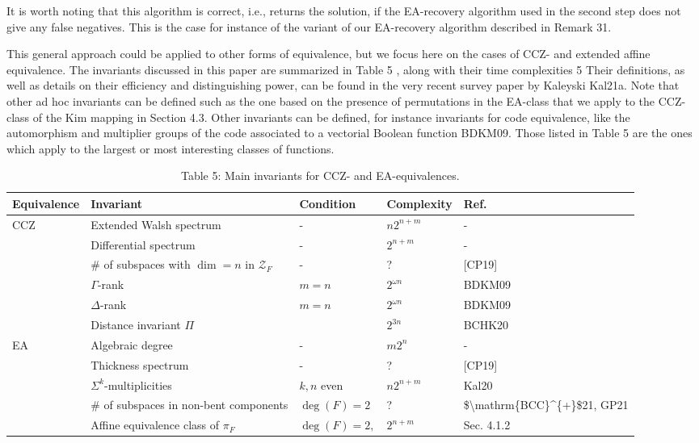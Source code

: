 \documentclass[10pt]{article}
\begin{document}
It is worth noting that this algorithm is correct, i.e., returns the solution, if the EA-recovery algorithm used in the second step does not give any false negatives. This is the case for instance of the variant of our EA-recovery algorithm described in Remark 31.

This general approach could be applied to other forms of equivalence, but we focus here on the cases of CCZ- and extended affine equivalence. The invariants discussed in this paper are summarized in Table 5 , along with their time complexities 5 Their definitions, as well as details on their efficiency and distinguishing power, can be found in the very recent survey paper by Kaleyski Kal21a. Note that other ad hoc invariants can be defined such as the one based on the presence of permutations in the EA-class that we apply to the CCZ-class of the Kim mapping in Section 4.3. Other invariants can be defined, for instance invariants for code equivalence, like the automorphism and multiplier groups of the code associated to a vectorial Boolean function BDKM09. Those listed in Table 5 are the ones which apply to the largest or most interesting classes of functions.

\begin{table}[h]
\begin{center}
\begin{tabular}{|l|l|l|l|l|}
\hline
Equivalence & Invariant & Condition & Complexity & Ref. \\
\hline
\multirow{6}{*}{CCZ} & Extended Walsh spectrum & - & $n 2^{n+m}$ & - \\
\hline
 & Differential spectrum & - & $2^{n+m}$ & - \\
\hline
 & $\#$ of subspaces with $\operatorname{dim}=n$ in $\mathcal{Z}_{F}$ & - & ? & [CP19] \\
\hline
 & $\Gamma$-rank & $m=n$ & $2^{\omega n}$ & BDKM09 \\
\hline
 & $\Delta$-rank & $m=n$ & $2^{\omega n}$ & BDKM09 \\
\hline
 & Distance invariant $\Pi$ &  & $2^{3 n}$ & BCHK20 \\
\hline
\multirow{5}{*}{EA} & Algebraic degree & - & $m 2^{n}$ & - \\
\hline
 & Thickness spectrum & - & ? & [CP19] \\
\hline
 & $\Sigma^{k}$-multiplicities & $k, n$ even & $n 2^{n+m}$ & Kal20 \\
\hline
 & \# of subspaces in non-bent components & $\operatorname{deg}(F)=2$ & ? & \$\textbackslash mathrm\{BCC\}\^{}\{+\}\$21, GP21 \\
\hline
 & Affine equivalence class of $\pi_{F}$ & \( \operatorname{deg}(F)=2, \) & $2^{n+m}$ & Sec. 4.1.2 \\
\hline
\end{tabular}
\captionsetup{labelformat=empty}
\caption{Table 5: Main invariants for CCZ- and EA-equivalences.}
\end{center}
\end{table}
\end{document}
